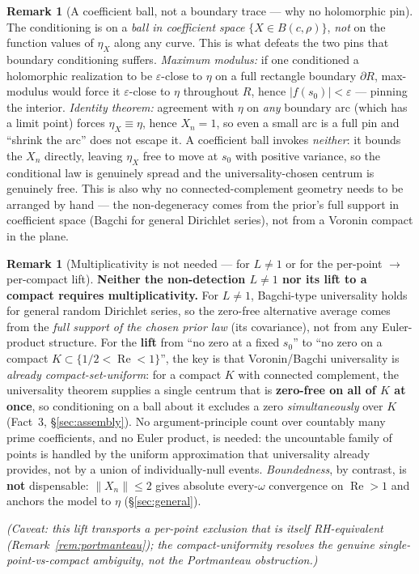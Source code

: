 \documentclass[11pt,a4paper]{article}
\theoremstyle{definition}
\newtheorem{remark}[theorem]{Remark}
\newcommand{\Rea}{\operatorname{Re}}
\newcommand{\etaX}{\eta_X}
\begin{document}
\begin{remark}[A coefficient ball, not a boundary trace --- why no holomorphic pin]\label{rem:maxmod}
The conditioning is on a \emph{ball in coefficient space} \(\{X\in B(c,\rho)\}\), \emph{not}
on the function values of \(\etaX\) along any curve. This is what defeats the two pins that
boundary conditioning suffers. \emph{Maximum modulus:} if one conditioned a holomorphic
realization to be \(\varepsilon\)-close to \(\eta\) on a full rectangle boundary \(\partial R\),
max-modulus would force it \(\varepsilon\)-close to \(\eta\) throughout \(R\), hence
\(|f(s_0)|<\varepsilon\) --- pinning the interior. \emph{Identity theorem:} agreement with
\(\eta\) on \emph{any} boundary arc (which has a limit point) forces \(\etaX\equiv\eta\), hence
\(X_n=1\), so even a small arc is a full pin and ``shrink the arc'' does not escape it. A
coefficient ball invokes \emph{neither}: it bounds the \(X_n\) directly, leaving \(\etaX\) free
to move at \(s_0\) with positive variance, so the conditional law is genuinely spread and the
universality-chosen centrum is genuinely free. This is also why no connected-complement
geometry needs to be arranged by hand --- the non-degeneracy comes from the prior's full
support in coefficient space (Bagchi for general Dirichlet series), not from a Voronin compact
in the plane.
\end{remark}

\begin{remark}[Multiplicativity is not needed --- for \(L\neq1\) or for the per-point \(\to\) per-compact lift]\label{rem:nomult}
\textbf{Neither the non-detection \(L\neq1\) nor its lift to a compact requires multiplicativity.}
For \(L\neq1\), Bagchi-type universality holds for general random Dirichlet series, so the
zero-free alternative average comes from the \emph{full support of the chosen prior law} (its
covariance), not from any Euler-product structure. For the \textbf{lift} from ``no zero at a fixed
\(s_0\)'' to ``no zero on a compact \(K\subset\{1/2<\Rea<1\}\)'', the key is that Voronin/Bagchi
universality is \emph{already compact-set-uniform}: for a compact \(K\) with connected complement,
the universality theorem supplies a single centrum that is \textbf{zero-free on all of \(K\) at
once}, so conditioning on a ball about it excludes a zero \emph{simultaneously} over \(K\)
(Fact~3, \S\ref{sec:assembly}). No argument-principle count over countably many prime coefficients,
and no Euler product, is needed: the uncountable family of points is handled by the uniform
approximation that universality already provides, not by a union of individually-null events.
\emph{Boundedness}, by contrast, is \textbf{not} dispensable: \(\|X_n\|\le 2\) gives absolute
every-\(\omega\) convergence on \(\Rea>1\) and anchors the model to \(\eta\) (\S\ref{sec:general}).

\emph{(Caveat: this lift transports a per-point exclusion that is itself RH-equivalent
(Remark~\ref{rem:portmanteau}); the compact-uniformity resolves the genuine
single-point-vs-compact ambiguity, not the Portmanteau obstruction.)}
\end{remark}
\end{document}
